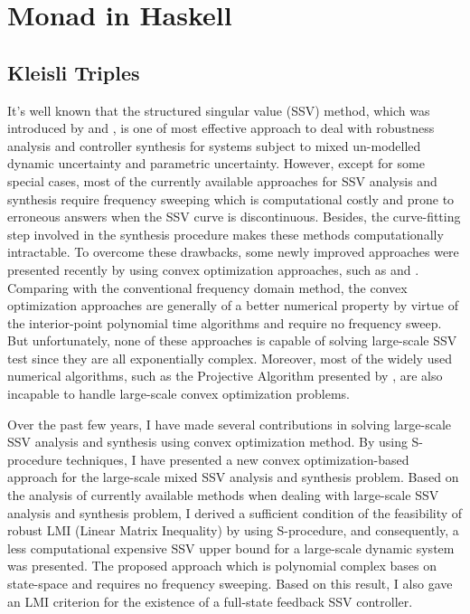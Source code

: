 \documentclass{article}
\begin{document}
\appendix
\section{Monad in Haskell}
\subsection{Kleisli Triples}

It's well known that the structured singular value (SSV) method,
which was introduced by {\citet{PBC91}} and {\citet{AS10}},
is one of most effective approach to deal with robustness analysis and controller synthesis for systems
subject to mixed un-modelled dynamic uncertainty and parametric uncertainty.
However, except for some special cases, most of the currently available approaches for SSV analysis and synthesis require
frequency sweeping which is computational costly and prone to erroneous answers
when the SSV curve is discontinuous.
Besides, the curve-fitting step involved in the synthesis procedure makes these methods computationally intractable.
To overcome these drawbacks, some newly improved approaches were presented recently by using convex optimization approaches,
such as {\citep{BirddeMoor96:Algebra}} and {\citep{AV12}}.
Comparing with the conventional frequency domain method,
the convex optimization approaches are generally of a better numerical property
by virtue of the interior-point polynomial time algorithms{\citep{AM75}} and require no frequency sweep.
But unfortunately, none of these approaches is capable of solving large-scale SSV test
since they are all exponentially complex.
Moreover, most of the widely used numerical algorithms,
such as the Projective Algorithm presented by {\citet{MLS98}},
are also incapable to handle large-scale convex optimization problems.

Over the past few years, I have made several contributions in solving large-scale SSV analysis and synthesis
using convex optimization method.
By using S-procedure techniques, I have presented a new convex optimization-based
approach for the large-scale mixed SSV analysis and synthesis problem.
Based on the analysis of currently available methods when dealing with large-scale SSV analysis and synthesis problem,
I derived a sufficient condition of the feasibility of robust LMI (Linear Matrix Inequality)
by using S-procedure, and consequently, a less computational expensive SSV upper bound for
a large-scale dynamic system was presented.
The proposed approach {\citep{BGM15}} which is polynomial complex bases on state-space and requires no frequency sweeping{\citep{MEG76}}.
Based on this result, I also gave an LMI criterion for the existence of a full-state feedback SSV controller{\citep{RDE85}}.
\end{document}
